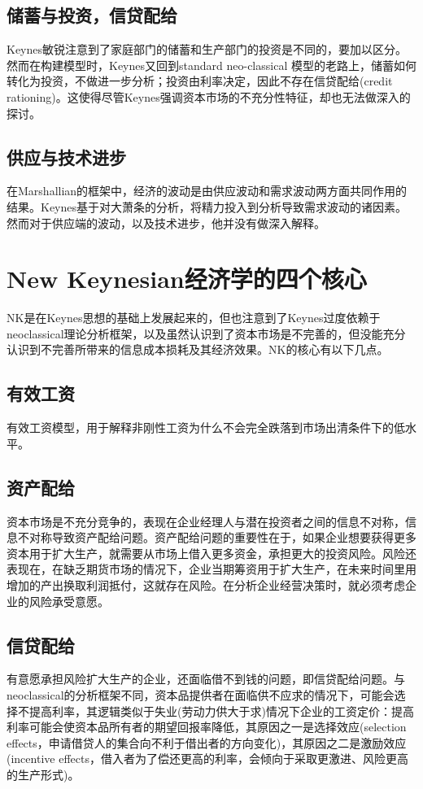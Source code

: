 \subsection{储蓄与投资，信贷配给}
\label{sec:KNK-savings-investment-credit-rationing}
Keynes敏锐注意到了家庭部门的储蓄和生产部门的投资是不同的，要加以区分。然而在构建模型时，Keynes又回到standard neo-classical 模型的老路上，储蓄如何转化为投资，不做进一步分析；投资由利率决定，因此不存在信贷配给(credit rationing)。这使得尽管Keynes强调资本市场的不充分性特征，却也无法做深入的探讨。

\subsection{供应与技术进步}
\label{sec:KNK-supply-tech}
在Marshallian的框架中，经济的波动是由供应波动和需求波动两方面共同作用的结果。Keynes基于对大萧条的分析，将精力投入到分析导致需求波动的诸因素。然而对于供应端的波动，以及技术进步，他并没有做深入解释。

\section{New Keynesian经济学的四个核心}
\label{sec:KNK-NK-keys}
NK是在Keynes思想的基础上发展起来的，但也注意到了Keynes过度依赖于neoclassical理论分析框架，以及虽然认识到了资本市场是不完善的，但没能充分认识到不完善所带来的信息成本损耗及其经济效果。NK的核心有以下几点。

\subsection{有效工资}
\label{sec:KNK-NK-efficiency-wage}
有效工资模型，用于解释非刚性工资为什么不会完全跌落到市场出清条件下的低水平。

\subsection{资产配给}
\label{sec:KNK-NK-equity-rationing}
资本市场是不充分竞争的，表现在企业经理人与潜在投资者之间的信息不对称，信息不对称导致资产配给问题。资产配给问题的重要性在于，如果企业想要获得更多资本用于扩大生产，就需要从市场上借入更多资金，承担更大的投资风险。风险还表现在，在缺乏期货市场的情况下，企业当期筹资用于扩大生产，在未来时间里用增加的产出换取利润抵付，这就存在风险。在分析企业经营决策时，就必须考虑企业的风险承受意愿。

\subsection{信贷配给}
\label{sec:KNK-NK-credit-rationing}
有意愿承担风险扩大生产的企业，还面临借不到钱的问题，即信贷配给问题。与neoclassical的分析框架不同，资本品提供者在面临供不应求的情况下，可能会选择不提高利率，其逻辑类似于失业(劳动力供大于求)情况下企业的工资定价：提高利率可能会使资本品所有者的期望回报率降低，其原因之一是选择效应(selection effects，申请借贷人的集合向不利于借出者的方向变化)，其原因之二是激励效应(incentive effects，借入者为了偿还更高的利率，会倾向于采取更激进、风险更高的生产形式)。

